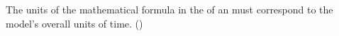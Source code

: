 The units of the mathematical formula in the  of an \Event
must correspond to the model's overall units of time.  ()
